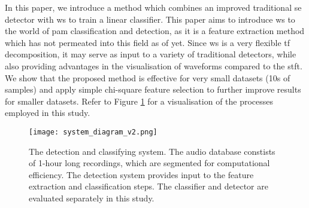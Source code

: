 In this paper, we introduce a method which combines an improved traditional \ac{se} detector with \ac{ws} to train a linear classifier. This paper aims to introduce \ac{ws} to the world of \ac{pam} classification and detection, as it is a feature extraction method which has not permeated into this field as of yet. Since \ac{ws} is a very flexible \ac{tf} decomposition, it may serve as input to a variety of traditional detectors, while also providing advantages in the visualisation of waveforms compared to the \ac{stft}. We show that the proposed method is effective for very small datasets (10s of samples) and apply simple chi-square feature selection \cite{chi2_fs} to further improve results for smaller datasets. Refer to Figure \ref{fig:system} for a visualisation of the processes employed in this study.

\begin{figure}[h]
    \centering
    \texttt{[image: system\_diagram\_v2.png]}
    \caption{The detection and classifying system. The audio database constists of 1-hour long recordings, which are segmented for computational efficiency. The detection system provides input to the feature extraction and classification steps. The classifier and detector are evaluated separately in this study.}
    \label{fig:system}
\end{figure}

\clearpage

